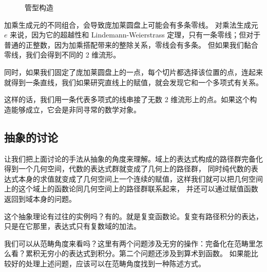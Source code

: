 \documentclass[a4paper,12pt]{article}
\numberwithin{problem}{section}
\numberwithin{definition}{section}
\numberwithin{lemma}{section}
\numberwithin{proposition}{section}
\numberwithin{theorem}{section}
\numberwithin{grammar}{section}
\numberwithin{program}{section}
\numberwithin{convention}{section}
\numberwithin{corollary}{section}
\begin{document}
\begin{figure}[ht]
    \centering
    \caption{管型构造}\label{fig:tube}
\end{figure}

加乘生成元的不同组合，会导致庞加莱圆盘上可能会有多条零线。
对乘法生成元 $e$ 来说，因为它的超越性和 Lindemann-Weierstrass 定理，只有一条零线；但对于普通的正整数，因为加乘搭配带来的整除关系，零线会有多条。
但如果我们黏合零线，我们会得到不同的 2 维流形。

同时，如果我们固定了庞加莱圆盘上的一点，每个切片都选择该位置的点，连起来就得到一条直线，我们如果研究直线上的赋值，就会发现它和一个多项式有关系。

这样的话，我们用一条代表多项式的线串接了无数 2 维流形上的点。如果这个构造能够成立，它会是非同寻常的数学对象。

\subsection{抽象的讨论}

让我们把上面讨论的手法从抽象的角度来理解。域上的表达式构成的路径群完备化得到一个几何空间，代数的表达式群就变成了几何上的路径群，
同时纯代数的表达式本身的求值就变成了几何空间上一个连续的赋值，这样我们就可以把几何空间上的这个域上的函数论同几何空间上的路径群联系起来，
并还可以通过赋值函数返回到域本身的问题。

这个抽象理论有过往的实例吗？有的。就是复变函数论。复变有路径积分的表达，只是在它那里，表达式只有复数域的加法。

我们可以从范畴角度来看吗？这里有两个问题涉及无穷的操作：完备化在范畴里怎么看？累积无穷小的表达式到积分。第二个问题还涉及到算术到函数。
如果能比较好的处理上述问题，应该可以在范畴角度找到一种陈述方式。
\end{document}
